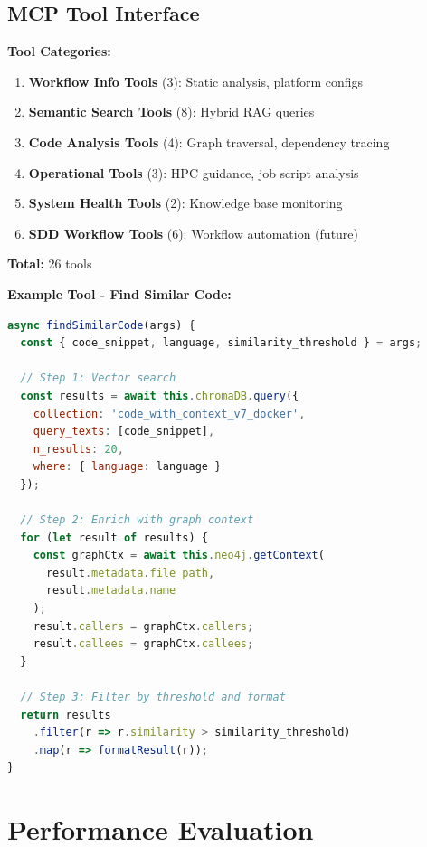 \documentclass[11pt,letterpaper]{article}
\begin{document}
\subsection{MCP Tool Interface}
\label{sec:tools}

\textbf{Tool Categories:}

\begin{enumerate}
    \item \textbf{Workflow Info Tools} (3): Static analysis, platform configs
    \item \textbf{Semantic Search Tools} (8): Hybrid RAG queries
    \item \textbf{Code Analysis Tools} (4): Graph traversal, dependency tracing
    \item \textbf{Operational Tools} (3): HPC guidance, job script analysis
    \item \textbf{System Health Tools} (2): Knowledge base monitoring
    \item \textbf{SDD Workflow Tools} (6): Workflow automation (future)
\end{enumerate}

\textbf{Total:} 26 tools

\textbf{Example Tool - Find Similar Code:}

\begin{lstlisting}[language=JavaScript, caption=MCP tool implementation]
async findSimilarCode(args) {
  const { code_snippet, language, similarity_threshold } = args;
  
  // Step 1: Vector search
  const results = await this.chromaDB.query({
    collection: 'code_with_context_v7_docker',
    query_texts: [code_snippet],
    n_results: 20,
    where: { language: language }
  });
  
  // Step 2: Enrich with graph context
  for (let result of results) {
    const graphCtx = await this.neo4j.getContext(
      result.metadata.file_path,
      result.metadata.name
    );
    result.callers = graphCtx.callers;
    result.callees = graphCtx.callees;
  }
  
  // Step 3: Filter by threshold and format
  return results
    .filter(r => r.similarity > similarity_threshold)
    .map(r => formatResult(r));
}
\end{lstlisting}

\section{Performance Evaluation}
\label{sec:evaluation}
\end{document}
